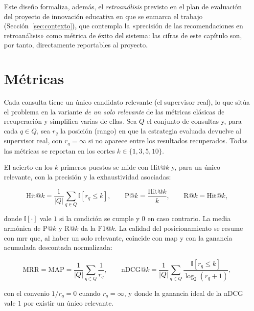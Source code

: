 Este diseño formaliza, además, el \emph{retroanálisis} previsto en el plan de evaluación del proyecto de innovación educativa en que se enmarca el trabajo (Sección~\ref{sec:contexto}), que contempla la «precisión de las recomendaciones en retroanálisis» como métrica de éxito del sistema: las cifras de este capítulo son, por tanto, directamente reportables al proyecto.

\section{Métricas}
\label{sec:eval-metricas}

Cada consulta tiene un único candidato relevante (el supervisor real), lo que sitúa el problema en la variante \emph{de un solo relevante} de las métricas clásicas de recuperación y simplifica varias de ellas.
Sea $Q$ el conjunto de consultas y, para cada $q \in Q$, sea $r_q$ la posición (rango) en que la estrategia evaluada devuelve al supervisor real, con $r_q = \infty$ si no aparece entre los resultados recuperados.
Todas las métricas se reportan en los cortes $k \in \{1, 3, 5, 10\}$.

El acierto en los $k$ primeros puestos se mide con $\mathrm{Hit@}k$ y, para un único relevante, con la precisión y la exhaustividad asociadas:

\begin{equation}
    \mathrm{Hit@}k = \frac{1}{|Q|} \sum_{q \in Q} \mathbb{I}\!\left[ r_q \le k \right],
    \qquad
    \mathrm{P@}k = \frac{\mathrm{Hit@}k}{k},
    \qquad
    \mathrm{R@}k = \mathrm{Hit@}k,
    \label{eq:hitk}
\end{equation}

donde $\mathbb{I}[\cdot]$ vale $1$ si la condición se cumple y $0$ en caso contrario.
La media armónica de $\mathrm{P@}k$ y $\mathrm{R@}k$ da la $\mathrm{F1@}k$.
La calidad del posicionamiento se resume con \gls{mrr} que, al haber un solo relevante, coincide con \gls{map} y con la ganancia acumulada descontada normalizada:

\begin{equation}
\mathrm{MRR} = \mathrm{MAP} = \frac{1}{|Q|} \sum_{q \in Q} \frac{1}{r_q},
\qquad
\mathrm{nDCG@}k = \frac{1}{|Q|} \sum_{q \in Q} \frac{\mathbb{I}\!\left[ r_q \le k \right]}{\log_2(r_q + 1)},
\label{eq:mrr}
\end{equation}

con el convenio $1/r_q = 0$ cuando $r_q = \infty$, y donde la ganancia ideal de la nDCG vale $1$ por existir un único relevante.

